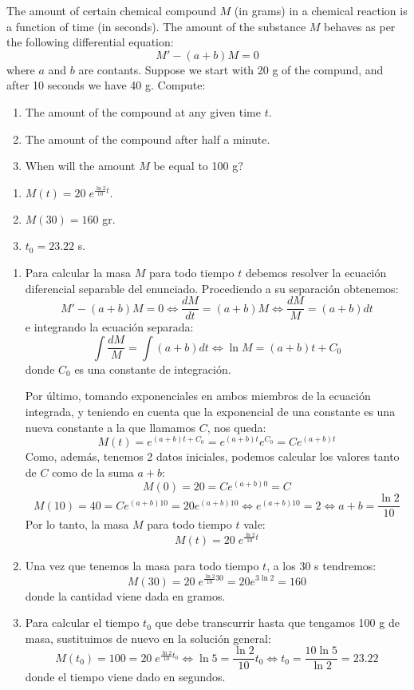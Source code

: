 {The amount of certain chemical compound $M$ (in grams) in a chemical reaction is a function of time (in seconds).
The amount of the substance $M$ behaves as per the following differential equation:
\[
M'-(a+b)M=0
\]
where $a$ and $b$ are contants.
Suppose we start with 20 g of the compund, and after 10 seconds we have 40 g.
Compute:
\begin{enumerate}
\item The amount of the compound at any given time $t$.
\item The amount of the compound after half a minute.
\item When will the amount $M$ be equal to 100 g?
\end{enumerate}
}
{\begin{enumerate}
\item $M(t) = 20\;e^{\frac{{\ln 2}}{{10}}t}.$
\item $M(30) = 160$ gr.
\item $t_0  = 23.22$ s.
\end{enumerate}
}
{
\begin{enumerate}
\item Para calcular la masa $M$ para todo tiempo $t$ debemos
resolver la ecuación diferencial separable del enunciado.
Procediendo a su separación obtenemos:
\[
M' - (a + b)M = 0 \Leftrightarrow \frac{{dM}}{{dt}} = (a + b)M
\Leftrightarrow \frac{{dM}}{M} = (a + b)dt
\]
e integrando la ecuación separada:
\[
\int {\frac{{dM}}{M}}  = \int {(a + b)dt}  \Leftrightarrow \ln M =
(a + b)t + C_0
\]
donde $C_0$ es una constante de integración.

Por último, tomando exponenciales en ambos miembros de la ecuación
integrada, y teniendo en cuenta que la exponencial de una constante
es una nueva constante a la que llamamos $C$, nos queda:
\[
M(t) = e^{(a + b)t + C_0 }  = e^{(a + b)t} e^{C_0 }  = Ce^{(a + b)t}
\]
Como, además, tenemos 2 datos iniciales, podemos calcular los
valores tanto de $C$ como de la suma $a+b$:
\[
M(0) = 20 = Ce^{(a + b)0}  = C
\]
\[
M(10) = 40 = Ce^{(a+b)10}=20e^{(a + b)10}  \Leftrightarrow e^{(a +
b)10} = 2 \Leftrightarrow a + b = \frac{{\ln 2}}{{10}}
\]
Por lo tanto, la masa $M$ para todo tiempo $t$ vale:
\[
M(t) = 20\;e^{\frac{{\ln 2}}{{10}}t}
\]

\item Una vez que tenemos la masa para todo tiempo $t$, a los 30 s
tendremos:
\[
M(30) = 20\;e^{\frac{{\ln 2}}{{10}}30}  = 20e^{3\ln 2}  = 160
\]
donde la cantidad viene dada en gramos.

\item Para calcular el tiempo $t_0$ que debe transcurrir hasta que
tengamos 100 g de masa, sustituimos de nuevo en la solución general:
\[
M(t_0 ) = 100 = 20\;e^{\frac{{\ln 2}}{{10}}t_0 }  \Leftrightarrow
\ln 5 = \frac{{\ln 2}}{{10}}t_0  \Leftrightarrow t_0  = \frac{{10\ln
5}}{{\ln 2}} = 23.22
\]
donde el tiempo viene dado en segundos.
\end{enumerate}
}


